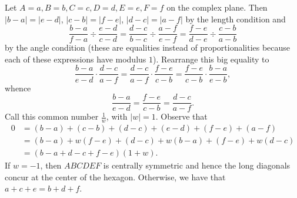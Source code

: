 Let $A=a,B=b,C=c,D=d,E=e,F=f$ on the complex plane. Then $\left|b-a\right|=\left|e-d\right|$, $\left|c-b\right|=\left|f-e\right|$, $\left|d-c\right|=\left|a-f\right|$ by the length condition and \[\frac{b-a}{f-a}\div\frac{e-d}{c-d}=\frac{d-c}{b-c}\div\frac{a-f}{e-f}=\frac{f-e}{d-e}\div\frac{c-b}{a-b}\] by the angle condition (these are equalities instead of proportionalities because each of these expressions have modulus $1$). Rearrange this big equality to \[\frac{b-a}{e-d}\cdot\frac{d-c}{a-f}=\frac{d-c}{a-f}\cdot\frac{f-e}{c-b}=\frac{f-e}{c-b}\cdot\frac{b-a}{e-b},\] whence \[\frac{b-a}{e-d}=\frac{f-e}{c-b}=\frac{d-c}{a-f}.\] Call this common number $\frac{1}{w}$, with $\left|w\right|=1$. Observe that
\begin{align*}
	0&=\left(b-a\right)+\left(c-b\right)+\left(d-c\right)+\left(e-d\right)+\left(f-e\right)+\left(a-f\right)\\
	&=\left(b-a\right)+w\left(f-e\right)+\left(d-c\right)+w\left(b-a\right)+\left(f-e\right)+w\left(d-c\right)\\
	&=\left(b-a+d-c+f-e\right)\left(1+w\right).
\end{align*}
If $w=-1$, then $ABCDEF$ is centrally symmetric and hence the long diagonals concur at the center of the hexagon. Otherwise, we have that $a+c+e=b+d+f$.

